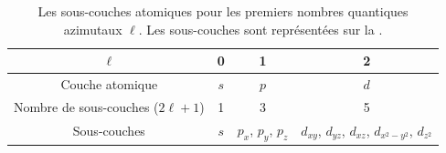 \documentclass[12pt,fancy]{cours}
\begin{document}
\begin{table}[h!]
\centering
\begin{tabular}{|c|c|c|c|}
\hline
$\ell$ & 0 & 1 & 2 \\
\hline
Couche atomique & 
$s$ & $p$ & $d$  \\ 
\hline
Nombre de sous-couches ($2\ell+1$) & 1 & 3 & 5 \\
\hline
Sous-couches & $s$ & $p_x$, $p_y$, $p_z$ & $d_{xy}$, $d_{yz}$, $d_{xz}$, $d_{x^2-y^2}$, $d_{z^2}$ \\
\hline
\end{tabular}
\caption{
  Les sous-couches atomiques pour les premiers nombres quantiques azimutaux $\ell$. Les sous-couches sont représentées sur la .
}
\label{tab:orbitals}
\end{table}
\end{document}
